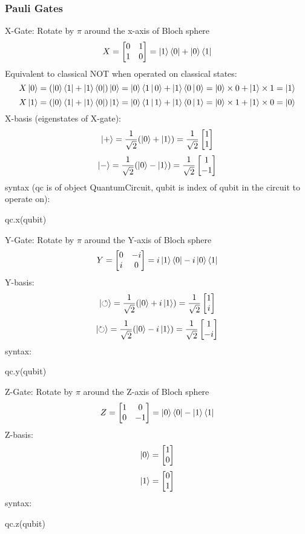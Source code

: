 \documentclass{article}
\begin{document}
\subsubsection*{Pauli Gates}
X-Gate: Rotate by $\pi$ around the x-axis of Bloch sphere
$$
X=
\begin{bmatrix}
    0 & 1\\
    1 & 0
\end{bmatrix}
=\Ket{1}\Bra{0}+\Ket{0}\Bra{1}
$$
Equivalent to classical NOT when operated on classical states:
$$X\Ket{0}=\left(\Ket{0}\Bra{1}+\Ket{1}\Bra{0}\right)\Ket{0}=\Ket{0}\Braket{1|0}+\Ket{1}\Braket{0|0}=\Ket{0}\times0+\Ket{1}\times1=\Ket{1}$$
$$X\Ket{1}=(\Ket{0}\Bra{1}+\Ket{1}\Bra{0})\Ket{1}=\Ket{0}\Braket{1|1}+\Ket{1}\Braket{0|1}=\Ket{0}\times1+\Ket{1}\times0=\Ket{0}$$
X-basis (eigenstates of X-gate):
$$
\Ket{+}=\frac{1}{\sqrt{2}}(\Ket{0}+\Ket{1})
=\frac{1}{\sqrt{2}}
\begin{bmatrix}
    1\\
    1
\end{bmatrix}
$$
$$
\Ket{-}=\frac{1}{\sqrt{2}}(\Ket{0}-\Ket{1})
=\frac{1}{\sqrt{2}}
\begin{bmatrix}
    1\\
    -1
\end{bmatrix}
$$
syntax (qc is of object QuantumCircuit, qubit is index of qubit in the circuit to operate on): 
\begin{verbatim*}
qc.x(qubit)    
\end{verbatim*}
Y-Gate: Rotate by $\pi$ around the Y-axis of Bloch sphere
$$
Y=
\begin{bmatrix}
    0 & -i\\
    i & 0
\end{bmatrix}
=i\Ket{1}\Bra{0}-i\Ket{0}\Bra{1}
$$
Y-basis:
$$
\Ket{\circlearrowleft}=\frac{1}{\sqrt{2}}(\Ket{0}+i\Ket{1})
=\frac{1}{\sqrt{2}}
\begin{bmatrix}
    1\\
    i
\end{bmatrix}
$$
$$
\Ket\circlearrowright=\frac{1}{\sqrt{2}}(\Ket{0}-i\Ket{1})
=\frac{1}{\sqrt{2}}
\begin{bmatrix}
    1\\
    -i
\end{bmatrix}
$$
syntax: 
\begin{verbatim*}
qc.y(qubit)    
\end{verbatim*}
Z-Gate: Rotate by $\pi$ around the Z-axis of Bloch sphere
$$
Z=
\begin{bmatrix}
    1 & 0\\
    0 & -1
\end{bmatrix}
=\Ket{0}\Bra{0}-\Ket{1}\Bra{1}
$$
Z-basis: 
$$
\Ket{0}=
\begin{bmatrix}
    1\\
    0
\end{bmatrix}
$$$$
\Ket{1}=
\begin{bmatrix}
    0\\
    1
\end{bmatrix}
$$
syntax: 
\begin{verbatim*}
qc.z(qubit)    
\end{verbatim*}
\newpage
\end{document}
